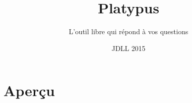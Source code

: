 \documentclass[10pt, compress]{beamer}
\title{Platypus}
\subtitle{L'outil libre qui répond à vos questions}
\date{JDLL 2015}
\begin{document}
\maketitle



\section{Aperçu}




\end{document}

